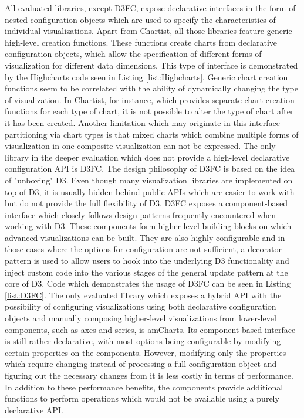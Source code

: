All evaluated libraries, except D3FC, expose declarative interfaces in the form of nested configuration objects which are used to specify the characteristics of individual visualizations.
Apart from Chartist, all those libraries feature generic high-level creation functions. 
These functions create charts from declarative configuration objects, which allow the specification of different forms of visualization for different data dimensions.
This type of interface is demonstrated by the Highcharts code seen in Listing \ref{list:Highcharts}.
Generic chart creation functions seem to be correlated with the ability of dynamically changing the type of visualization.
In Chartist, for instance, which provides separate chart creation functions for each type of chart, it is not possible to alter the type of chart after it has been created.
Another limitation which may originate in this interface partitioning via chart types is that mixed charts which combine multiple forms of visualization in one composite visualization can not be expressed.
The only library in the deeper evaluation which does not provide a high-level declarative configuration API is D3FC.
The design philosophy of D3FC is based on the idea of "unboxing" D3.
Even though many visualization libraries are implemented on top of D3, it is usually hidden behind public APIs which are easier to work with but do not provide the full flexibility of D3.
D3FC exposes a component-based interface which closely follows design patterns frequently encountered when working with D3. 
These components form higher-level building blocks on which advanced visualizations can be built. 
They are also highly configurable and in those cases where the options for configuration are not sufficient, a decorator pattern is used to allow users to hook into the underlying D3 functionality and inject custom code into the various stages of the general update pattern at the core of D3.
Code which demonstrates the usage of D3FC can be seen in Listing \ref{list:D3FC}. 
The only evaluated library which exposes a hybrid API with the possibility of configuring visualizations using both declarative configuration objects and manually composing higher-level visualizations from lower-level components, such as axes and series, is amCharts.
Its component-based interface is still rather declarative, with most options being configurable by modifying certain properties on the components.
However, modifying only the properties which require changing instead of processing a full configuration object and figuring out the necessary changes from it is less costly in terms of performance. 
In addition to these performance benefits, the components provide additional functions to perform operations which would not be available using a purely declarative API.

